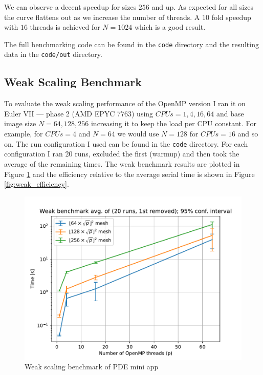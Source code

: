 \documentclass[unicode,11pt,a4paper,oneside,numbers=endperiod,openany]{scrartcl}
\begin{document}
We can observe a decent speedup for sizes $256$ and up. As expected for all sizes the curve flattens out as we increase the number of threads. A $10$ fold speedup with $16$ threads is achieved for $N=1024$ which is a good result.

The full benchmarking code can be found in the \texttt{code} directory and the resulting data in the \texttt{code/out} directory.

\subsection{Weak Scaling Benchmark}

To evaluate the weak scaling performance of the OpenMP version I ran it on Euler VII — phase 2 (AMD EPYC 7763) using $CPUs=1, 4, 16, 64$ and base image size $N=64, 128, 256$ increasing it to keep the load per CPU constant. For example, for $CPUs=4$ and $N=64$ we would use $N=128$ for $CPUs=16$ and so on. The run configuration I used can be found in the \texttt{code} directory. For each configuration I ran 20 runs, excluded the first (warmup) and then took the average of the remaining times. The weak benchmark results are plotted in Figure \ref{fig:weak_scaling} and the efficiency relative to the average serial time is shown in Figure \ref{fig:weak_efficiency}.

\begin{figure}[h!t]
    \includegraphics[width=\textwidth]{plots/weak_scaling.pdf}
    \caption{Weak scaling benchmark of PDE mini app}
    \label{fig:weak_scaling}
\end{figure}
\end{document}
